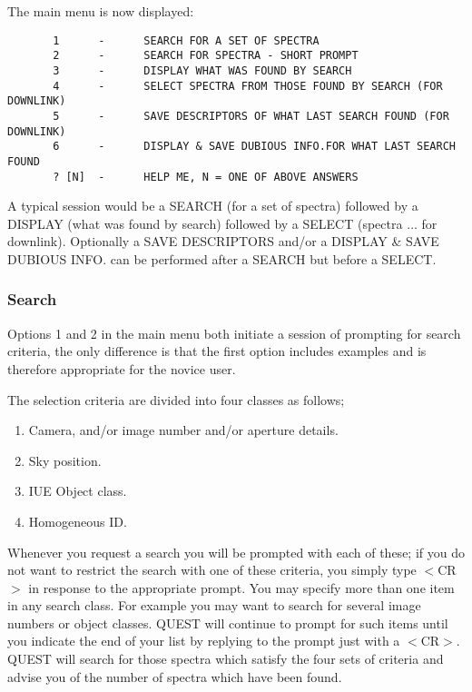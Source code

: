 The main menu is now displayed:
\begin{verbatim}
       1      -      SEARCH FOR A SET OF SPECTRA
       2      -      SEARCH FOR SPECTRA - SHORT PROMPT
       3      -      DISPLAY WHAT WAS FOUND BY SEARCH
       4      -      SELECT SPECTRA FROM THOSE FOUND BY SEARCH (FOR DOWNLINK)
       5      -      SAVE DESCRIPTORS OF WHAT LAST SEARCH FOUND (FOR DOWNLINK)
       6      -      DISPLAY & SAVE DUBIOUS INFO.FOR WHAT LAST SEARCH FOUND
       ? [N]  -      HELP ME, N = ONE OF ABOVE ANSWERS
\end{verbatim}
A typical session would be a SEARCH (for a set of spectra) followed
by a DISPLAY (what was found by search)
followed by a SELECT (spectra $\ldots$ for downlink).
Optionally a SAVE DESCRIPTORS and/or a DISPLAY \& SAVE DUBIOUS INFO.
can be performed after a SEARCH but before a SELECT.

\subsubsection{Search}%
Options 1 and 2 in the main menu both initiate a session of prompting for search
criteria, the only difference is that the first option  includes examples
and is therefore appropriate for the novice user.

The selection criteria are divided into four classes as follows;
\begin{enumerate}
\item Camera, and/or image number and/or aperture details.
\item Sky position.
\item IUE Object class.
\item Homogeneous ID.
\end{enumerate}
Whenever you request a search you will be prompted with each of these;
if you do not want to restrict the search with one of these criteria,
you simply type $<$CR$>$ in response to the appropriate prompt.
You may specify more than one item in any search class. For
example you may want to search for several image numbers or object classes.
QUEST will continue to prompt for such items until you indicate the end of your
list by replying to the prompt just with a $<$CR$>$.
QUEST will search for those spectra which satisfy the four sets of
criteria and advise you of the number of spectra which have been found.

